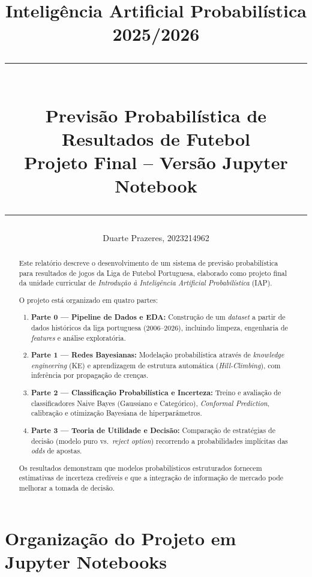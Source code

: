 \documentclass[12pt, a4paper]{article}
\title{
    \vspace{-1cm}

    {\large Inteligência Artificial Probabilística 2025/2026}\\[0.2cm]

    \rule{\linewidth}{0.5pt}\\[0.4cm]
    {\LARGE \textbf{Previsão Probabilística de Resultados de Futebol}}\\[0.3cm]
    {\large Projeto Final -- Versão Jupyter Notebook}\\[0.2cm]
    \rule{\linewidth}{0.5pt}
}
\author{
    Duarte Prazeres, 2023214962 \\
    \small
}
\begin{document}

\maketitle
\thispagestyle{empty}

\begin{abstract}
Este relatório descreve o desenvolvimento de um sistema de previsão probabilística para resultados de jogos da Liga de Futebol Portuguesa, elaborado como projeto final da unidade curricular de \emph{Introdução à Inteligência Artificial Probabilística} (IAP).

O projeto está organizado em quatro partes:

\begin{enumerate}[leftmargin=2em]
  \item \textbf{Parte 0 — Pipeline de Dados e EDA:} Construção de um \textit{dataset} a partir de dados históricos da liga portuguesa (2006--2026), incluindo limpeza, engenharia de \textit{features} e análise exploratória.
  \item \textbf{Parte 1 — Redes Bayesianas:} Modelação probabilística através de \textit{knowledge engineering} (KE) e aprendizagem de estrutura automática (\textit{Hill-Climbing}), com inferência por propagação de crenças.
  \item \textbf{Parte 2 — Classificação Probabilística e Incerteza:} Treino e avaliação de classificadores Naive Bayes (Gaussiano e Categórico), \textit{Conformal Prediction}, calibração e otimização Bayesiana de hiperparâmetros.
  \item \textbf{Parte 3 — Teoria de Utilidade e Decisão:} Comparação de estratégias de decisão (modelo puro vs.\ \textit{reject option}) recorrendo a probabilidades implícitas das \textit{odds} de apostas.
\end{enumerate}

Os resultados demonstram que modelos probabilísticos estruturados fornecem estimativas de incerteza credíveis e que a integração de informação de mercado pode melhorar a tomada de decisão.
\end{abstract}

\newpage
\tableofcontents
\newpage

\section{Organização do Projeto em Jupyter Notebooks}
\end{document}
